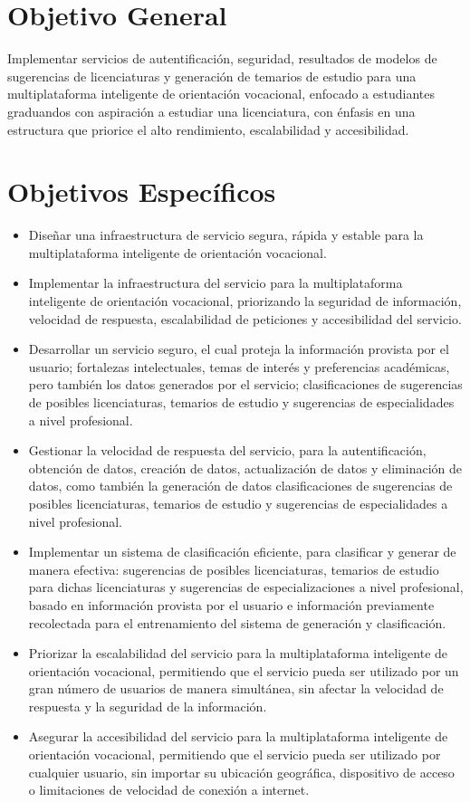 \section{Objetivo General}
Implementar servicios de
autentificación, seguridad,
resultados de modelos de sugerencias de licenciaturas y generación de temarios de estudio
para una multiplataforma 
inteligente de orientación vocacional,
enfocado a estudiantes graduandos con aspiración a 
estudiar una licenciatura, con énfasis en una estructura que priorice el alto rendimiento,
escalabilidad y accesibilidad.

\section{Objetivos Específicos}
\begin{itemize}
\item Diseñar una infraestructura de servicio segura, rápida y estable para la multiplataforma inteligente de orientación vocacional.
\item Implementar la infraestructura del servicio para la multiplataforma inteligente de orientación vocacional, priorizando la seguridad de información, velocidad de respuesta, escalabilidad de peticiones y accesibilidad del servicio.
\item Desarrollar un servicio seguro, el cual proteja la información provista por el usuario; fortalezas intelectuales, temas de interés y preferencias académicas, pero también los datos generados por el servicio; clasificaciones de sugerencias de posibles licenciaturas, temarios de estudio y sugerencias de especialidades a nivel profesional.
\item Gestionar la velocidad de respuesta del servicio, para la autentificación, obtención de datos, creación de datos, actualización de datos y eliminación de datos, como también la generación de datos clasificaciones de sugerencias de posibles licenciaturas, temarios de estudio y sugerencias de especialidades a nivel profesional.
\item Implementar un sistema de clasificación eficiente, para clasificar y generar de manera efectiva: sugerencias de posibles licenciaturas, temarios de estudio para dichas licenciaturas y sugerencias de especializaciones a nivel profesional, basado en información provista por el usuario e información previamente recolectada para el entrenamiento del sistema de generación y clasificación.
\item Priorizar la escalabilidad del servicio para la multiplataforma inteligente de orientación vocacional, permitiendo que el servicio pueda ser utilizado por un gran número de usuarios de manera simultánea, sin afectar la velocidad de respuesta y la seguridad de la información.
\item Asegurar la accesibilidad del servicio para la multiplataforma inteligente de orientación vocacional, permitiendo que el servicio pueda ser utilizado por cualquier usuario, sin importar su ubicación geográfica, dispositivo de acceso o limitaciones de velocidad de conexión a internet.
\end{itemize}